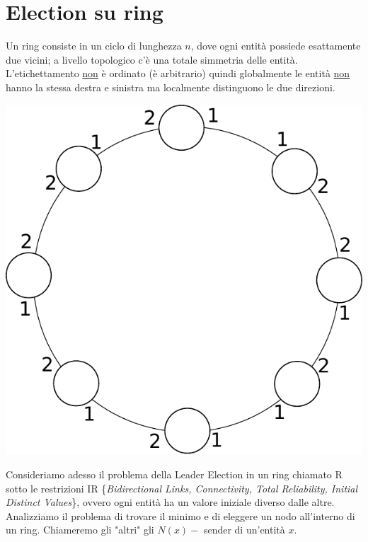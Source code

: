\section{Election su ring}
Un ring consiste in un ciclo di lunghezza $n$, dove ogni entità possiede
esattamente due vicini; a livello topologico c'è una totale simmetria delle
entità.\\
L'etichettamento \underline{non} è ordinato (è arbitrario) quindi globalmente le
entità \underline{non} hanno la stessa destra e sinistra ma localmente
distinguono le due direzioni.
\begin{center}
    \includegraphics[scale=0.5]{capitoli/leader-election/imgs/n_43}
\end{center}
Consideriamo adesso il problema della Leader Election in un ring chiamato R
sotto le restrizioni IR \{\textit{Bidirectional Links, Connectivity, Total
    Reliability, Initial Distinct Values}\}, ovvero ogni entità ha un valore
iniziale diverso dalle altre.\\ Analizziamo il problema di trovare il minimo e
di eleggere un nodo all'interno di un ring. Chiameremo gli "altri" gli $N(x) - $
sender di un'entità $x$.


